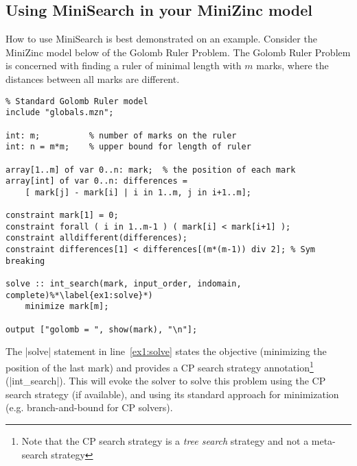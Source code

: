 \documentclass[a4paper,13pt,onecolumn]{article}%
\newcommand{\MiniZinc}{\mbox{\sc MiniZinc}\xspace}
\newcommand{\MiniSearch}{\mbox{\sc MiniSearch}\xspace}
\begin{document}
\subsection{Using \MiniSearch in your \MiniZinc model}
How to use \MiniSearch is best demonstrated on an example. Consider the \MiniZinc model below of the Golomb Ruler Problem.
The Golomb Ruler Problem is concerned with finding a ruler of minimal length with $m$ marks,
where the distances between all marks are different. 
\begin{lstlisting}
% Standard Golomb Ruler model
include "globals.mzn";

int: m;          % number of marks on the ruler
int: n = m*m;    % upper bound for length of ruler

array[1..m] of var 0..n: mark;  % the position of each mark
array[int] of var 0..n: differences =
    [ mark[j] - mark[i] | i in 1..m, j in i+1..m];

constraint mark[1] = 0;
constraint forall ( i in 1..m-1 ) ( mark[i] < mark[i+1] );
constraint alldifferent(differences);
constraint differences[1] < differences[(m*(m-1)) div 2]; % Sym breaking

solve :: int_search(mark, input_order, indomain, complete)%*\label{ex1:solve}*)
    minimize mark[m];

output ["golomb = ", show(mark), "\n"];
\end{lstlisting}
The \mzninline|solve| statement in line~\ref{ex1:solve} states the
objective (minimizing the position of the last mark) and provides 
a CP search strategy annotation\footnote{Note that the CP search strategy is a {\em tree search} strategy and not a meta-search strategy} (\mzninline|int_search|).
This will evoke the solver to solve this problem using the CP search strategy 
(if available), and using its standard approach for minimization (e.g. branch-and-bound for CP solvers).
\end{document}
